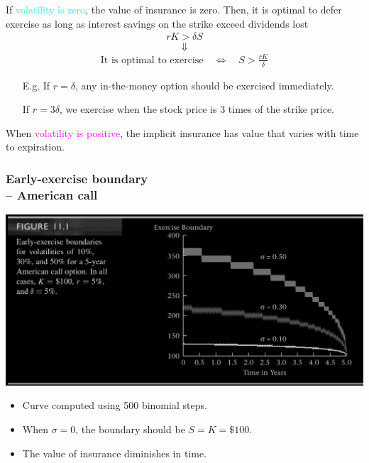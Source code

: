 \begin{frame}[fragile]
	If \textcolor{cyan}{volatility is zero}, the value of insurance is zero. Then, it is optimal to defer exercise as long as interest savings on the strike exceed dividends lost
	\begin{align*}
		r K > \delta S
	\end{align*}
	\[\Downarrow\]
	\begin{align*}
		\text{It is optimal to exercise} \quad \Longleftrightarrow \quad S> \frac{rK}{\delta}
	\end{align*}
	\begin{itemize}
		\item[E.g.] If $r=\delta$, any in-the-money option should be exercised immediately.
		\item[] If $r=3\delta$, we exercise when the stock price is 3 times of the strike price.
	\end{itemize}
	\bigskip
	\mySeparateLine
	\bigskip
	\pause
	When \textcolor{magenta}{volatility is positive}, the implicit insurance has value that varies
	with time to expiration.
\end{frame}
\begin{frame}[fragile,t]
	\frametitle{Early-exercise boundary \\ -- American call}
	\begin{center}
		\includegraphics[scale=0.25]{figs/Figure-11-1.png}
	\end{center}
	\pause
	\begin{itemize}
		\item Curve computed using 500 binomial steps.
		\item When $\sigma=0$, the boundary should be $S=K=\$100$.
		\item The value of insurance diminishes in time.
	\end{itemize}
\end{frame}
